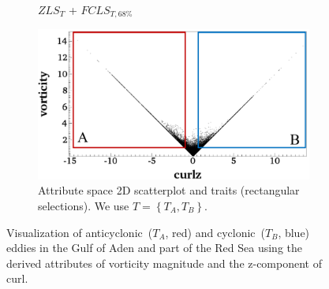 \begin{figure}[!h]
\begin{subfigure}{0.24\linewidth}
\vspace{-2mm}
\caption{$ZLS_{T}$ + $FCLS_{T,68\%}$}
\label{fig:rse_fcls}
\end{subfigure}
\hfill
\begin{subfigure}{0.24\linewidth}
\centering
\includegraphics[width=0.95\linewidth]{Images/RedSeaEddy/scatterplot.pdf}
\vspace{-2mm}
\caption{Attribute space 2D scatterplot and traits (rectangular selections). We use $T = \left\{T_{A}, T_{B}\right\}$.} 
\label{fig:rse_scatterplot}
\end{subfigure}
\vspace{-2mm}
\caption{Visualization of anticyclonic~($T_{A}$, red) and cyclonic~($T_{B}$, blue) eddies in the Gulf of Aden and part of the Red Sea using the derived attributes of vorticity magnitude and the z-component of curl.}
\label{fig:rse}
\end{figure}
